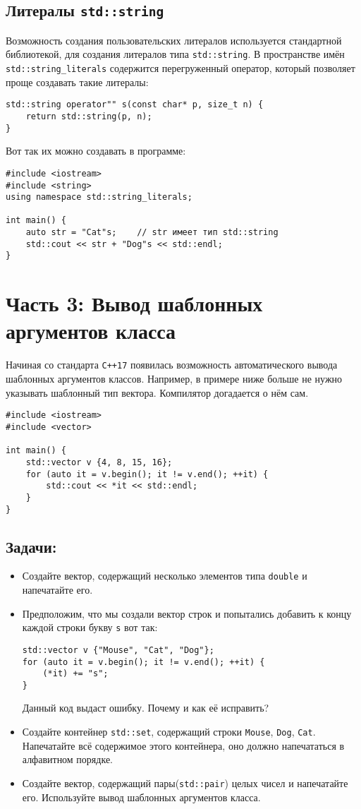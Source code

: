 \documentclass{article}
\begin{document}
\subsection*{Литералы \texttt{std::string}}
Возможность создания пользовательских литералов используется стандартной библиотекой, для создания литералов типа \texttt{std::string}.
В пространстве имён \texttt{std::string\_literals} содержится перегруженный оператор, который позволяет проще создавать такие литералы:
\begin{lstlisting}
std::string operator"" s(const char* p, size_t n) {
    return std::string(p, n);
}
\end{lstlisting}

Вот так их можно создавать в программе:

\begin{lstlisting}
#include <iostream>
#include <string>
using namespace std::string_literals;

int main() {
    auto str = "Cat"s;    // str имеет тип std::string
    std::cout << str + "Dog"s << std::endl; 
}
\end{lstlisting}
\newpage
\section*{Часть 3: Вывод шаблонных аргументов класса}
Начиная со стандарта \texttt{C++17} появилась возможность автоматического вывода шаблонных аргументов классов. Например, в примере ниже больше не нужно указывать шаблонный тип вектора. Компилятор догадается о нём сам.

\begin{lstlisting}
#include <iostream>
#include <vector>

int main() {
    std::vector v {4, 8, 15, 16};
    for (auto it = v.begin(); it != v.end(); ++it) {
    	std::cout << *it << std::endl;    
    }
}
\end{lstlisting}
\subsection*{Задачи:}
\begin{itemize}
\item Создайте вектор, содержащий несколько элементов типа \texttt{double} и напечатайте его.
\item Предположим, что мы создали вектор строк и попытались добавить к концу каждой строки букву \texttt{s} вот так:
\begin{lstlisting}
std::vector v {"Mouse", "Cat", "Dog"};
for (auto it = v.begin(); it != v.end(); ++it) {
    (*it) += "s";
}
\end{lstlisting}
Данный код выдаст ошибку. Почему и как её исправить?
\item Создайте контейнер \texttt{std::set}, содержащий строки \texttt{Mouse}, \texttt{Dog}, \texttt{Cat}. Напечатайте всё содержимое этого контейнера, оно должно напечататься в алфавитном порядке.

\item Создайте вектор, содержащий пары(\texttt{std::pair}) целых чисел и напечатайте его. Используйте вывод шаблонных аргументов класса.
\end{itemize}
\end{document}
